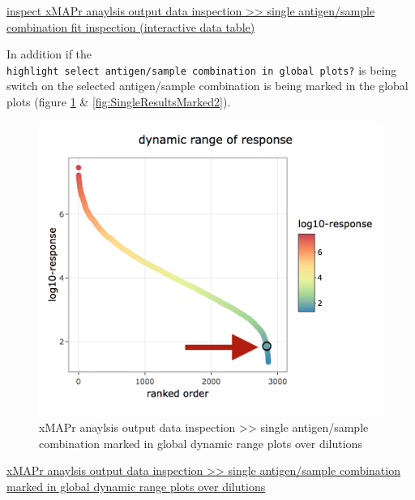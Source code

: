 \documentclass[
]{book}
\begin{document}
\href{figures/inspect_single_results3.png}{inspect xMAPr anaylsis output data inspection \textgreater\textgreater{} single antigen/sample combination fit inspection (interactive data table)}

In addition if the \texttt{highlight\ select\ antigen/sample\ combination\ in\ global\ plots?} is being switch on the selected antigen/sample combination is being marked in the global plots (figure \ref{fig:SingleResultsMarked1} \& \ref{fig:SingleResultsMarked2}).

\begin{figure}
\includegraphics[width=13.5in]{figures/inspect_single_results2_dyn_range} \caption{xMAPr anaylsis output data inspection >> single antigen/sample combination marked in global dynamic range plots over dilutions}\label{fig:SingleResultsMarked1}
\end{figure}

\href{figures/inspect_single_results2_dyn_range.png}{xMAPr anaylsis output data inspection \textgreater\textgreater{} single antigen/sample combination marked in global dynamic range plots over dilutions}
\end{document}
